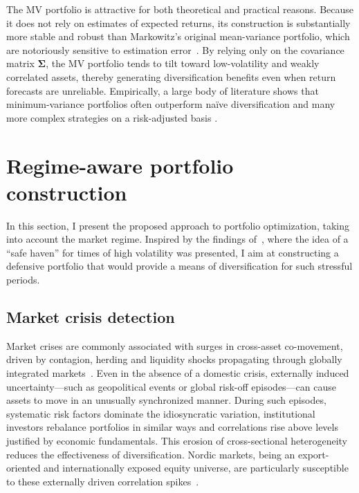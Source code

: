 \documentclass[pdflatex,sn-basic]{sn-jnl}%
\theoremstyle{thmstyleone}%
\theoremstyle{thmstyletwo}%
\theoremstyle{thmstylethree}%
\newcommand{\bSigma}{\boldsymbol{\Sigma}}
\begin{document}
The MV portfolio is attractive for both theoretical and practical reasons. Because it does not rely on estimates of expected returns, its construction is substantially more stable and robust than Markowitz's original mean-variance portfolio, which are notoriously sensitive to estimation error~\citep{merton1980estimating}. By relying only on the covariance matrix $\bSigma$, the MV portfolio tends to tilt toward low-volatility and weakly correlated assets, thereby generating diversification benefits even when return forecasts are unreliable. Empirically, a large body of literature shows that minimum-variance portfolios often outperform na\"{i}ve diversification and many more complex strategies on a risk-adjusted basis \citep[see, e.g.,][]{jagannathan2003risk,clarke2006minimum}.

\section{Regime-aware portfolio construction}
\label{sec:portfolio_construction}
In this section, I present the proposed approach to portfolio optimization, taking into account the market regime. Inspired by the findings of~\cite{molero2025random}, where the idea of a ``safe haven'' for times of high volatility was presented, I aim at constructing a defensive portfolio that would provide a means of diversification for such stressful periods. 

\subsection{Market crisis detection}
\label{sec:crisis_detection}
Market crises are commonly associated with surges in cross-asset co-movement, driven by contagion, herding and liquidity shocks propagating through globally integrated markets~\citep{bekaert2003market, chiang2007dynamic}. Even in the absence of a domestic crisis, externally induced uncertainty---such as geopolitical events or global risk-off episodes---can cause assets to move in an unusually synchronized manner. During such episodes, systematic risk factors dominate the idiosyncratic variation, institutional investors rebalance portfolios in similar ways and correlations rise above levels justified by economic fundamentals. This erosion of cross-sectional heterogeneity reduces the effectiveness of diversification. Nordic markets, being an export-oriented and internationally exposed equity universe, are particularly susceptible to these externally driven correlation spikes~\citep{fjaervik2023crash}.
\end{document}

